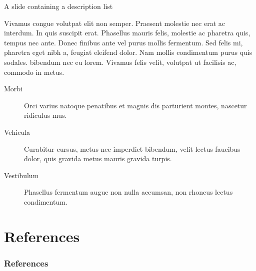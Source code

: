 \documentclass[
  ignorenonframetext,
  aspectratio=169,
  xcolor={dvipsnames,rgb}
]{beamer}
\begin{document}
  \begin{frame}{A slide containing a description list}

    Vivamus congue volutpat elit non semper. Praesent molestie nec erat ac interdum. In quis suscipit erat. \alert{Phasellus mauris felis, molestie ac pharetra quis}, tempus nec ante. Donec finibus ante vel purus mollis fermentum. Sed felis mi, pharetra eget nibh a, feugiat eleifend dolor. Nam mollis condimentum purus quis sodales. bibendum nec eu lorem. Vivamus felis velit, volutpat ut facilisis ac, commodo in metus.

    \begin{description}
      \item[Morbi] Orci varius natoque penatibus et magnis dis parturient
        montes, nascetur ridiculus mus.
      \item[Vehicula] Curabitur cursus, metus nec imperdiet bibendum,
        velit lectus faucibus dolor, quis gravida metus mauris gravida turpis.
      \item[Vestibulum] Phasellus fermentum augue non
        nulla accumsan, non rhoncus lectus condimentum.
    \end{description}

  \end{frame}

  \begin{frame}

    \thispagestyle{empty@titlepage}
    \begingroup
    \endgroup

  \end{frame}

\hypertarget{references}{\section{References}}

  \begin{frame}[t,allowframebreaks]

    \frametitle{References}
    

  \end{frame}
\end{document}
